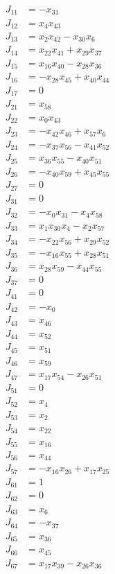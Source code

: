 \documentclass[11pt]{article}
\begin{document}
\begin{align*}
J_{11} &= - x_{31} \\
J_{12} &= x_{4} x_{43} \\
J_{13} &= x_{2} x_{42} - x_{30} x_{6} \\
J_{14} &= x_{22} x_{41} + x_{29} x_{37} \\
J_{15} &= x_{16} x_{40} - x_{28} x_{36} \\
J_{16} &= - x_{28} x_{45} + x_{40} x_{44} \\
J_{17} &= 0 \\
J_{21} &= x_{58} \\
J_{22} &= x_{0} x_{43} \\
J_{23} &= - x_{42} x_{46} + x_{57} x_{6} \\
J_{24} &= - x_{37} x_{56} - x_{41} x_{52} \\
J_{25} &= x_{36} x_{55} - x_{40} x_{51} \\
J_{26} &= - x_{40} x_{59} + x_{45} x_{55} \\
J_{27} &= 0 \\
J_{31} &= 0 \\
J_{32} &= - x_{0} x_{31} - x_{4} x_{58} \\
J_{33} &= x_{1} x_{30} x_{4} - x_{2} x_{57} \\
J_{34} &= - x_{22} x_{56} + x_{29} x_{52} \\
J_{35} &= - x_{16} x_{55} + x_{28} x_{51} \\
J_{36} &= x_{28} x_{59} - x_{44} x_{55} \\
J_{37} &= 0 \\
J_{41} &= 0 \\
J_{42} &= - x_{0} \\
J_{43} &= x_{46} \\
J_{44} &= x_{52} \\
J_{45} &= x_{51} \\
J_{46} &= x_{59} \\
J_{47} &= x_{17} x_{54} - x_{26} x_{51} \\
J_{51} &= 0 \\
J_{52} &= x_{4} \\
J_{53} &= x_{2} \\
J_{54} &= x_{22} \\
J_{55} &= x_{16} \\
J_{56} &= x_{44} \\
J_{57} &= - x_{16} x_{26} + x_{17} x_{25} \\
J_{61} &= 1 \\
J_{62} &= 0 \\
J_{63} &= x_{6} \\
J_{64} &= - x_{37} \\
J_{65} &= x_{36} \\
J_{66} &= x_{45} \\
J_{67} &= x_{17} x_{39} - x_{26} x_{36}
\end{align*}
\end{document}
